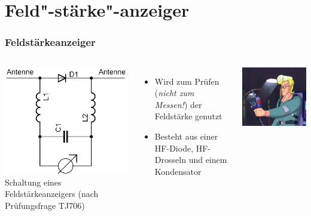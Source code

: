 \section*{Feld"-stärke"-anzeiger}
\begin{frame}
  \frametitle{Feldstärkeanzeiger}
  \begin{columns}
    \begin{center}
      \includegraphics[width=\textwidth,height=.8\textheight,keepaspectratio]{a16/Feldstaerkeanzeiger.png}\\
      {\tiny Schaltung eines Feldstärkeanzeigers (nach Prüfungsfrage TJ706)}
    \end{center}
    \begin{itemize}
      \item Wird zum Prüfen (\emph{nicht zum Messen!}) der Feldstärke genutzt
      \item Besteht aus einer HF-Diode, HF-Drosseln und einem Kondensator
    \end{itemize}
    \begin{flushright}
      \includegraphics[width=.7\textwidth,keepaspectratio]{a16/ghostbusters_egon.jpg}\\

\end{flushright}
\end{columns}
\end{frame}
